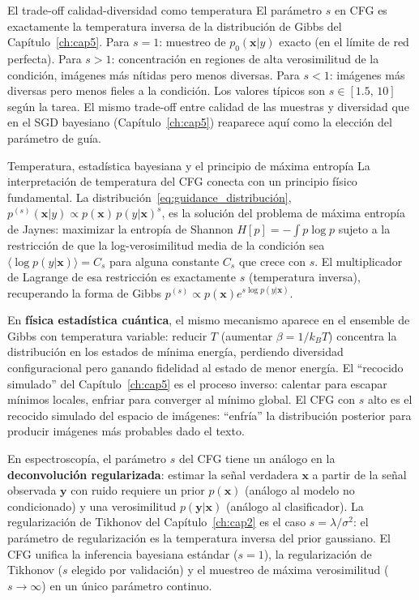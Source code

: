 \begin{observacion}{El trade-off calidad-diversidad como temperatura}
El parámetro $s$ en CFG es exactamente la temperatura inversa de la distribución
de Gibbs del Capítulo~\ref{ch:cap5}. Para $s=1$: muestreo de $p_0(\bm{x}|y)$ exacto (en el
límite de red perfecta). Para $s>1$: concentración en regiones de alta
verosimilitud de la condición, imágenes más nítidas pero menos diversas. Para
$s<1$: imágenes más diversas pero menos fieles a la condición. Los valores
típicos son $s\in[1.5,\,10]$ según la tarea. El mismo trade-off entre calidad
de las muestras y diversidad que en el SGD bayesiano (Capítulo~\ref{ch:cap5}) reaparece aquí
como la elección del parámetro de guía.
\end{observacion}

\begin{fisicaconexion}{Temperatura, estadística bayesiana y el principio de máxima entropía}
La interpretación de temperatura del CFG conecta con un principio físico
fundamental. La distribución~\eqref{eq:guidance_distribución},
$p^{(s)}(\bm{x}|y) \propto p(\bm{x})\,p(y|\bm{x})^s$, es la solución del
problema de máxima entropía de Jaynes: maximizar la entropía de Shannon
$H[p] = -\int p\log p$ sujeto a la restricción de que la log-verosimilitud
media de la condición sea $\langle\log p(y|\bm{x})\rangle = C_s$ para alguna
constante $C_s$ que crece con $s$. El multiplicador de Lagrange de esa
restricción es exactamente $s$ (temperatura inversa), recuperando la forma de
Gibbs $p^{(s)} \propto p(\bm{x}) e^{s\log p(y|\bm{x})}$.

En \textbf{física estadística cuántica}, el mismo mecanismo aparece en el
ensemble de Gibbs con temperatura variable: reducir $T$ (aumentar $\beta = 1/k_BT$)
concentra la distribución en los estados de mínima energía, perdiendo diversidad
configuracional pero ganando fidelidad al estado de menor energía. El ``recocido
simulado'' del Capítulo~\ref{ch:cap5} es el proceso inverso: calentar para escapar
mínimos locales, enfriar para converger al mínimo global. El CFG con $s$ alto es
el recocido simulado del espacio de imágenes: ``enfría'' la distribución posterior
para producir imágenes más probables dado el texto.

En espectroscopía, el parámetro $s$ del CFG tiene un análogo en la
\textbf{deconvolución regularizada}: estimar la señal verdadera $\bm{x}$ a
partir de la señal observada $\bm{y}$ con ruido requiere un prior $p(\bm{x})$
(análogo al modelo no condicionado) y una verosimilitud $p(\bm{y}|\bm{x})$
(análogo al clasificador). La regularización de Tikhonov del Capítulo~\ref{ch:cap2}
es el caso $s = \lambda/\sigma^2$: el parámetro de regularización es la
temperatura inversa del prior gaussiano. El CFG unifica la inferencia bayesiana
estándar ($s=1$), la regularización de Tikhonov ($s$ elegido por validación) y
el muestreo de máxima verosimilitud ($s\to\infty$) en un único parámetro continuo.
\end{fisicaconexion}
